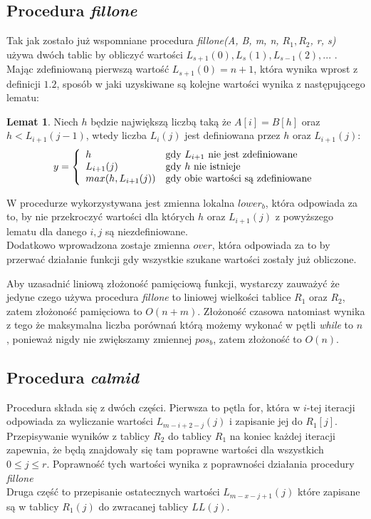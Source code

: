 \documentclass[12pt]{article}
\theoremstyle{definition}
\theoremstyle{definition}
\theoremstyle{definition}
\newtheorem{lemma}{Lemat}[section]
\begin{document}
\subsection{Procedura \textit{fillone}}

Tak jak zostało już wspomniane procedura \textit{fillone(A, B, m, n, $R_1, R_2$, r, s)} używa dwóch tablic by obliczyć wartości $L_{s+1}(0), L_s(1), L_{s-1}(2), ...$ . Mając zdefiniowaną pierwszą wartość $L_{s+1}(0) = n + 1$, która wynika wprost z definicji $1.2$, sposób w jaki uzyskiwane są kolejne wartości wynika z następującego lematu:
\begin{lemma}
Niech $h$ będzie największą liczbą taką że $A[i] = B[h]$ oraz $h < L_{i+1}(j - 1)$, wtedy liczba $L_i(j)$ jest definiowana przez $h$ oraz $L_{i+1}(j)$:
$$
y = \left\{ \begin{array}{ll}
h & \textrm{gdy $ L_{i+1} $ nie jest zdefiniowane}\\
L_{i+1}(j) & \textrm{gdy $ h $ nie istnieje}\\
max(h, L_{i+1}(j)) & \textrm{gdy obie wartości są zdefiniowane}
\end{array} \right.
$$
\end{lemma}

W procedurze wykorzystywana jest zmienna lokalna $lower_b$, która odpowiada za to, by nie przekroczyć wartości dla których $h$ oraz $L_{i+1}(j)$ z powyższego lematu dla danego $i, j$ są niezdefiniowane.\\
Dodatkowo wprowadzona zostaje zmienna $over$, która odpowiada za to by przerwać działanie funkcji gdy wszystkie szukane wartości zostały już obliczone.

Aby uzasadnić liniową złożoność pamięciową funkcji, wystarczy zauważyć że jedyne czego używa procedura \textit{fillone} to liniowej wielkości tablice $R_1$ oraz $R_2$, zatem złożoność pamięciowa to $O(n + m)$.
Złożoność czasowa natomiast wynika z tego że maksymalna liczba porównań którą możemy wykonać w pętli \textit{while} to $n$, ponieważ nigdy nie zwiększamy zmiennej $pos_b$, zatem złożoność to $O(n)$.

\subsection{Procedura \textit{calmid}}

Procedura składa się z dwóch części. Pierwsza to pętla for, która w $i$-tej iteracji odpowiada za wyliczanie wartości $L_{m-i+2-j}(j)$ i zapisanie jej do $R_1[j]$. Przepisywanie wyników z tablicy $R_2$ do tablicy $R_1$ na koniec każdej iteracji zapewnia, że będą znajdowały się tam poprawne wartości dla wszystkich $0 \leq j \leq r$. Poprawność tych wartości wynika z poprawności działania procedury \textit{fillone} \\
Druga część to przepisanie ostatecznych wartości $L_{m-x-j+1}(j)$ które zapisane są w tablicy $R_1(j)$ do zwracanej tablicy $LL(j)$.\\
\end{document}
